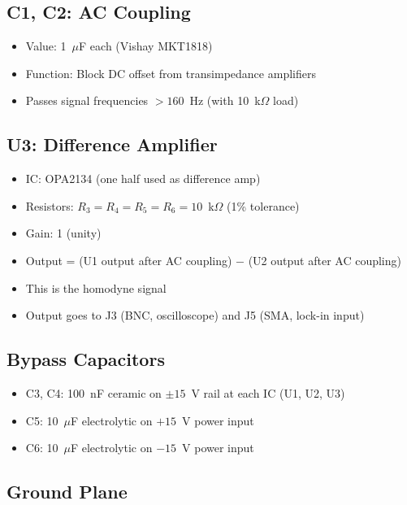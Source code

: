 \documentclass[11pt,a4paper,openany]{book}
\begin{document}
\subsection{C1, C2: AC Coupling}

\begin{itemize}[nosep]
  \item Value: 1~$\mu$F each (Vishay MKT1818)
  \item Function: Block DC offset from transimpedance amplifiers
  \item Passes signal frequencies $> 160$~Hz (with 10~k$\Omega$ load)
\end{itemize}

\subsection{U3: Difference Amplifier}

\begin{itemize}[nosep]
  \item IC: OPA2134 (one half used as difference amp)
  \item Resistors: $R_3 = R_4 = R_5 = R_6 = 10$~k$\Omega$ (1\% tolerance)
  \item Gain: 1 (unity)
  \item Output = (U1 output after AC coupling) $-$ (U2 output after AC coupling)
  \item This is the homodyne signal
  \item Output goes to J3 (BNC, oscilloscope) and J5 (SMA, lock-in input)
\end{itemize}

\subsection{Bypass Capacitors}

\begin{itemize}[nosep]
  \item C3, C4: 100~nF ceramic on $\pm 15$~V rail at each IC (U1, U2, U3)
  \item C5: 10~$\mu$F electrolytic on $+15$~V power input
  \item C6: 10~$\mu$F electrolytic on $-15$~V power input
\end{itemize}

\subsection{Ground Plane}
\end{document}
